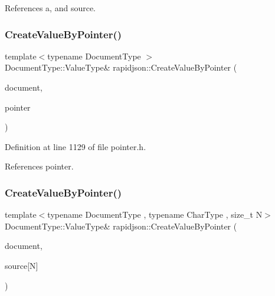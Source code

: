 References a, and source.

\mbox{\label{namespacerapidjson_afea8374e37ec67d3d1f08eb8c109f40c}} 
\subsubsection{\texorpdfstring{CreateValueByPointer()}{CreateValueByPointer()}\hspace{0.1cm}{\footnotesize\ttfamily [3/4]}}
{\footnotesize\ttfamily template$<$typename Document\+Type $>$ \\
Document\+Type\+::\+Value\+Type\& rapidjson\+::\+Create\+Value\+By\+Pointer (\begin{DoxyParamCaption}\item[{Document\+Type \&}]{document,  }\item[{const \mbox{\hyperlink{classrapidjson_1_1_generic_pointer}{Generic\+Pointer}}$<$ typename Document\+Type\+::\+Value\+Type $>$ \&}]{pointer }\end{DoxyParamCaption})}



Definition at line 1129 of file pointer.\+h.


\begin{DoxyCode}{0}

\end{DoxyCode}


References pointer.

\mbox{\label{namespacerapidjson_a7bebd7d041eb5f91245401c674bc1776}} 
\subsubsection{\texorpdfstring{CreateValueByPointer()}{CreateValueByPointer()}\hspace{0.1cm}{\footnotesize\ttfamily [4/4]}}
{\footnotesize\ttfamily template$<$typename Document\+Type , typename Char\+Type , size\+\_\+t N$>$ \\
Document\+Type\+::\+Value\+Type\& rapidjson\+::\+Create\+Value\+By\+Pointer (\begin{DoxyParamCaption}\item[{Document\+Type \&}]{document,  }\item[{const Char\+Type(\&)}]{source\mbox{[}\+N\mbox{]} }\end{DoxyParamCaption})}



